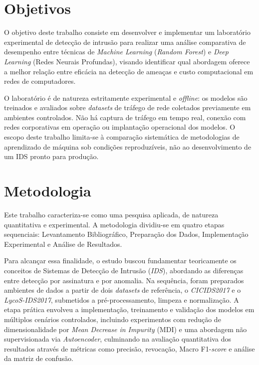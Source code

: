 \section{Objetivos}

O objetivo deste trabalho consiste em desenvolver e implementar um laboratório experimental de detecção de intrusão para realizar uma análise comparativa de desempenho entre técnicas de \textit{Machine Learning} (\textit{Random Forest}) e \textit{Deep Learning} (Redes Neurais Profundas), visando identificar qual abordagem oferece a melhor relação entre eficácia na detecção de ameaças e custo computacional em redes de computadores.

O laboratório é de natureza estritamente experimental e \textit{offline}: os modelos são treinados e avaliados sobre \textit{datasets} de tráfego de rede coletados previamente em ambientes controlados. Não há captura de tráfego em tempo real, conexão com redes corporativas em operação ou implantação operacional dos modelos. O escopo deste trabalho limita-se à comparação sistemática de metodologias de aprendizado de máquina sob condições reproduzíveis, não ao desenvolvimento de um IDS pronto para produção.

\section{Metodologia}

Este trabalho caracteriza-se como uma pesquisa aplicada, de natureza quantitativa e experimental. A metodologia dividiu-se em quatro etapas sequenciais: Levantamento Bibliográfico, Preparação dos Dados, Implementação Experimental e Análise de Resultados.

Para alcançar essa finalidade, o estudo buscou fundamentar teoricamente os conceitos de Sistemas de Detecção de Intrusão (\textit{IDS}), abordando as diferenças entre detecção por assinatura e por anomalia. Na sequência, foram preparados ambientes de dados a partir de dois \textit{datasets} de referência, o \textit{CICIDS2017} e o \textit{LycoS-IDS2017}, submetidos a pré-processamento, limpeza e normalização. A etapa prática envolveu a implementação, treinamento e validação dos modelos em múltiplos cenários controlados, incluindo experimentos com redução de dimensionalidade por \textit{Mean Decrease in Impurity} (MDI) e uma abordagem não supervisionada via \textit{Autoencoder}, culminando na avaliação quantitativa dos resultados através de métricas como precisão, revocação, Macro F1-\textit{score} e análise da matriz de confusão.


